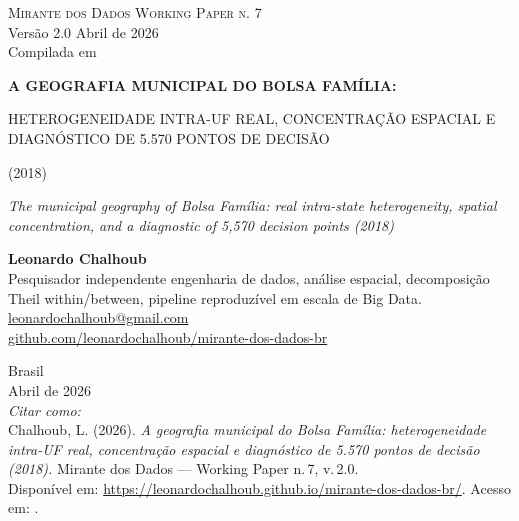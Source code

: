 \documentclass[12pt,a4paper,oneside]{article}
\begin{document}
\begin{titlepage}
  \begin{center}
    \vspace*{1.5cm}
    {\small\textsc{Mirante dos Dados \quad\textbar\quad Working Paper n. 7}}\\
    {\small Versão 2.0 \textemdash{} Abril de 2026}\\[2pt]
    {\footnotesize Compilada em \COMPILESTAMP\ \textbullet\ \texttt{\COMPILESHA}}

    \vfill

    {\LARGE\bfseries
     A GEOGRAFIA MUNICIPAL DO BOLSA FAMÍLIA:

     HETEROGENEIDADE INTRA-UF REAL,
     CONCENTRAÇÃO ESPACIAL E
     DIAGNÓSTICO DE
     5.570 PONTOS DE DECISÃO

     (2018)}

    \vspace{1cm}
    {\large\itshape
     The municipal geography of Bolsa Família: real intra-state heterogeneity,
     spatial concentration, and a diagnostic of 5{,}570 decision points
     (2018)}

    \vfill

    {\large\textbf{Leonardo Chalhoub}}\\[4pt]
    {\small Pesquisador independente \textemdash{} engenharia de dados,
     análise espacial, decomposição Theil within/between,
     pipeline reproduzível em escala de Big Data.}\\[2pt]
    {\small\href{mailto:leonardochalhoub@gmail.com}{leonardochalhoub@gmail.com}}\\
    {\small\href{https://github.com/leonardochalhoub/mirante-dos-dados-br}{github.com/leonardochalhoub/mirante-dos-dados-br}}

    \vfill

    {\small Brasil \\ Abril de 2026}\\[6pt]
    {\footnotesize\textit{Citar como:}\\[2pt]
     Chalhoub, L. (2026). \textit{A geografia municipal do Bolsa Família:
     heterogeneidade intra-UF real, concentração espacial e diagnóstico
     de 5.570 pontos de decisão (2018).}
     Mirante dos Dados — Working Paper n.\,7, v.\,2.0.\\
     Disponível em: \url{https://leonardochalhoub.github.io/mirante-dos-dados-br/}.
     Acesso em: \COMPILESTAMP.}
  \end{center}
\end{titlepage}
\end{document}
